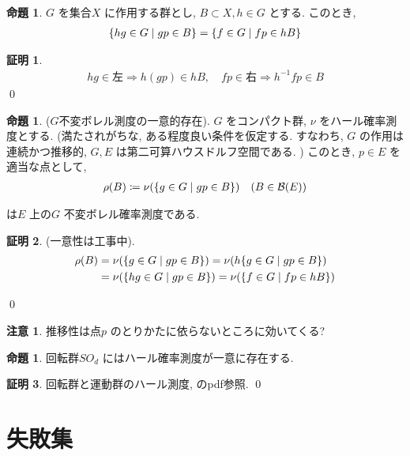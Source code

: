 \documentclass[10pt, fleqn, label-section=none]{bxjsarticle}
\theoremstyle{definition}
\newtheorem{prop}[dfn]{命題}
\newtheorem*{pf*}{証明}
\newtheorem{remark}[dfn]{注意}
\newcommand{\cbra}[1]{\mleft\{#1\mright\}}
\newcommand{\naraba}{\Rightarrow}
\renewcommand{\;}{\, ; \,}
\begin{document}
\begin{prop}$G$ を集合$X$ に作用する群とし, $B \subset X, h \in G$ とする. このとき, 
\begin{align*} \cbra{hg \in G \mid gp \in B } = \cbra{f \in G \mid fp \in hB }\end{align*}
\end{prop}
\begin{pf*}
\begin{align*} hg \in \textrm{左} \naraba h(gp) \in hB , \quad
fp \in \textrm{右} \naraba h^{-1} fp \in B
\end{align*}
\qed
\end{pf*}



\begin{prop}($G$不変ボレル測度の一意的存在). $G$ をコンパクト群, $\nu$ をハール確率測度とする. (満たされがちな, ある程度良い条件を仮定する. すなわち, $G$ の作用は連続かつ推移的, $G, E$ は第二可算ハウスドルフ空間である. ) このとき, $p \in E$ を適当な点として, 
\begin{align*} \rho(B) \coloneqq \nu (\cbra{g \in G \mid gp \in B})      \quad (B \in \mathcal B (E) ) \end{align*}

は$E$ 上の$G$ 不変ボレル確率測度である. 
\end{prop}
\begin{pf*}(一意性は工事中). 
\begin{align*} \rho(B) &= \nu (  \cbra{g \in G \mid gp \in B}   ) = \nu(h  \cbra{g \in G \mid gp \in B} )   \\
&= \nu(  \cbra{h g \in G \mid gp \in B} ) = \nu(  \cbra{f \in G \mid fp \in hB} ) 
\end{align*}

\qed
\end{pf*}

\begin{remark}推移性は点$p$ のとりかたに依らないところに効いてくる? 

\end{remark}

\begin{prop}回転群$SO_d$ にはハール確率測度が一意に存在する.

\end{prop}
\begin{pf*}
回転群と運動群のハール測度, のpdf参照.
\qed
\end{pf*}


\section{失敗集}
\end{document}
